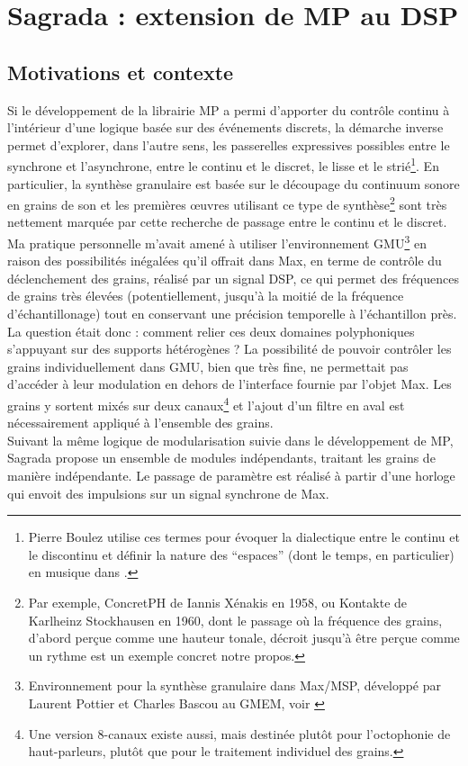 \section{Sagrada : extension de MP au DSP}
\label{sec:algorithms:sagrada}

\subsection{Motivations et contexte}

\noindent Si le développement de la librairie MP a permi d'apporter du contrôle continu à l'intérieur d'une logique basée sur des événements discrets, la démarche inverse permet d'explorer, dans l'autre sens, les passerelles expressives possibles entre le synchrone et l'asynchrone, entre le continu et le discret, le lisse et le strié\footnote{Pierre Boulez utilise ces termes pour évoquer la dialectique entre le continu et le discontinu et définir la nature des ``espaces'' (dont le temps, en particulier) en musique dans \cite{boulez_penser_1987}.}. En particulier, la synthèse granulaire est basée sur le découpage du continuum sonore en grains de son et les premières œuvres utilisant ce type de synthèse\footnote{Par exemple, ConcretPH de Iannis Xénakis en 1958, ou Kontakte de Karlheinz Stockhausen en 1960, dont le passage où la fréquence des grains, d'abord perçue comme une hauteur tonale, décroit jusqu'à être perçue comme un rythme est un exemple concret notre propos.} sont très nettement marquée par cette recherche de passage entre le continu et le discret.\\
\indent Ma pratique personnelle m'avait amené à utiliser l'environnement GMU\footnote{Environnement pour la synthèse granulaire dans Max/MSP, développé par Laurent Pottier et Charles Bascou au \gls{GMEM}, voir \cite{bascou_gmu_2005}} en raison des possibilités inégalées qu'il offrait dans Max, en terme de contrôle du déclenchement des grains, réalisé par un signal \gls{DSP}, ce qui permet des fréquences de grains très élevées (potentiellement, jusqu'à la moitié de la fréquence d'échantillonage) tout en conservant une précision temporelle à l'échantillon près.\\
\indent La question était donc : comment relier ces deux domaines polyphoniques s'appuyant sur des supports hétérogènes ? La possibilité de pouvoir contrôler les grains individuellement dans GMU, bien que très fine, ne permettait pas d'accéder à leur modulation en dehors de l'interface fournie par l'objet Max. Les grains y sortent mixés sur deux canaux\footnote{Une version 8-canaux existe aussi, mais destinée plutôt pour l'octophonie de haut-parleurs, plutôt que pour le traitement individuel des grains.} et l'ajout d'un filtre en aval est nécessairement appliqué à l'ensemble des grains.\\
\indent Suivant la même logique de modularisation suivie dans le développement de MP, Sagrada propose un ensemble de modules indépendants, traitant les grains de manière indépendante. Le passage de paramètre est réalisé à partir d'une horloge qui envoit des impulsions sur un signal synchrone de Max.

